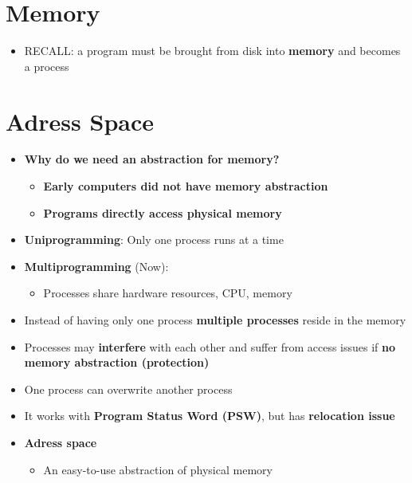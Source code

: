 \documentclass[a4paper,11pt,english]{article}
\begin{document}


\textbf{\color{blue} }

\section*{Memory}
\begin{itemize}
    \item RECALL: a program must be brought from disk into \textbf{\color{blue} memory} and becomes a process 
\end{itemize}

\section*{Adress Space}
\begin{itemize}
    \item \textbf{\color{red} Why do we need an abstraction for memory?}
        \begin{itemize}
            \item \textbf{\color{red} Early computers did not have memory abstraction}
            \item \textbf{\color{red} Programs directly access physical memory}
        \end{itemize}
    \item \textbf{\color{blue} Uniprogramming}: Only one process runs at a time
    \item \textbf{\color{blue} Multiprogramming} (Now):
        \begin{itemize}
            \item Processes share hardware resources, CPU, memory
        \end{itemize}
    \item Instead of having only one process \textbf{\color{blue} multiple processes} reside in the memory
    \item Processes may \textbf{\color{red} interfere} with each other and suffer from access issues if \textbf{\color{blue} no memory abstraction (protection)}
    \item One process can overwrite another process
    \item It works with \textbf{\color{blue} Program Status Word (PSW)}, but has \textbf{\color{blue} relocation issue}
    \item \textbf{\color{blue} Adress space}
        \begin{itemize}
            \item An easy-to-use abstraction of physical memory

\end{itemize}
\end{itemize}
\end{document}
